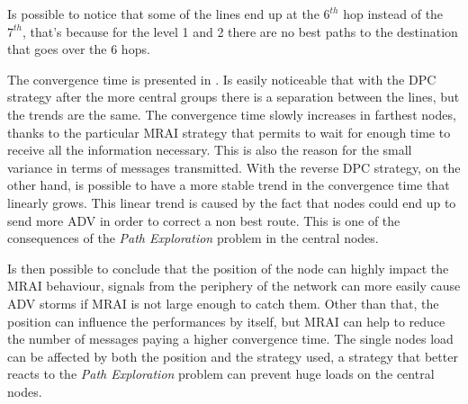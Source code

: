 Is possible to notice that some of the lines end up at the $6^{th}$ hop instead
of the $7^{th}$, that's because for the level \num{1} and \num{2} there are
no best paths to the destination that goes over the \num{6} hops.

The convergence time is presented in
.
Is easily noticeable that with the \ac{DPC} strategy after the
more central groups there is a separation between the lines, but the trends
are the same.
The convergence time slowly increases in farthest nodes, thanks to the particular
\ac{MRAI} strategy that permits to wait for enough time to receive all the information
necessary.
This is also the reason for the small variance in terms of messages transmitted.
With the reverse \ac{DPC} strategy, on the other hand, is possible to have a
more stable trend in the convergence time that linearly grows.
This linear trend is caused by the fact that nodes could end up to send more
\ac{ADV} in order to correct a non best route.
This is one of the consequences of the \textit{Path Exploration} problem in
the central nodes.

Is then possible to conclude that the position of the node can highly impact
the \ac{MRAI} behaviour, signals from the periphery of the network can more
easily cause \ac{ADV} storms if \ac{MRAI} is not large enough to catch them.
Other than that, the position can influence the performances by itself, but
\ac{MRAI} can help to reduce the number of messages paying a higher convergence
time.
The single nodes load can be affected by both the position and the strategy
used, a strategy that better reacts to the \textit{Path Exploration} problem
can prevent huge loads on the central nodes.

